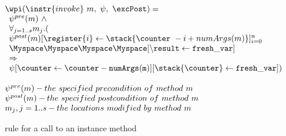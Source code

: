 \begin{figure}[!ht]
$$
\begin{array}{l}
\wpi(\instr{invoke} \ m, \ \psi ,\ \excPost) =\\ 
\begin{array}{l}
\psi^{pre}(m) \ \wedge \\
 \forall_{j = 1..s} m_{j}.( \\
\psi^{post}(m)[\register{i}  \leftarrow \stack{\counter \ - i + numArgs(m)}]_{i=0}^n  \\
\Myspace \Myspace\Myspace \Myspace[\tt{\backslash result} \leftarrow fresh\_var] \\
\Rightarrow \\
 \psi[\counter \leftarrow \counter - \tt{numArgs}(m)][\stack{\counter }  \leftarrow \tt{fresh\_var}]) \\
\end{array} \\[15 mm]
\psi^{pre}(m) - the \ specified \ precondition \ of \ method \ m \\
\psi^{post}(m) - the \ specified \ postcondition \ of \ method \ m \\
m_{j} , j = 1 .. s - the \ locations \ modified \ by \ method \ m
\end{array}
$$
\caption{\wpi \ rule for a call to an instance method}
\label{wpInv}
\end{figure}
